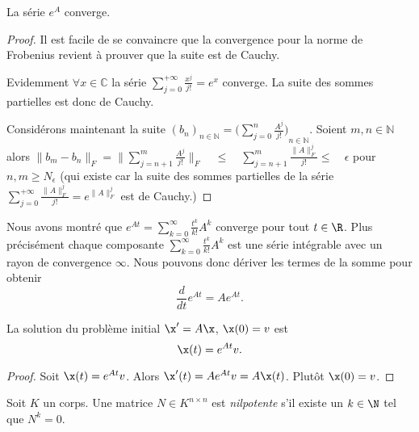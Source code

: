   \begin{lemma}
    \label{lem:17}
    La série $e^A$ converge. 
  \end{lemma}

  \begin{proof}
Il est facile de se convaincre que la convergence pour la norme de Frobenius revient à prouver que la suite est de Cauchy. 

Evidemment $\forall x \in \mathbb{C}$ la série $\sum _{ j=0 }^{ +\infty  }{ \frac { { x }^{ j } }{ j! } ={ e }^{ x } } $ converge. La suite des sommes partielles est donc de Cauchy.

Considérons maintenant la suite $(b_n)_{n\in \mathbb{N}} = { (\sum _{ j=0 }^{ n }{ \frac { { A }^{ j } }{ j! } ) }  }_{ n\in \mathbb{N} }$. Soient $m,n \in \mathbb{N}$ alors $\parallel b_{ m }-b_{ n }\parallel _{ F }=\parallel \sum _{ j=n+1 }^{ m }{ \frac { A^{ j } }{ j! }  } \parallel _{ F }\quad \le \quad \sum_{j=n+1}^{m}{\frac{\parallel A\parallel_{F}^{j}}{j!}} \le \quad \epsilon $ pour $n,m \ge N_{\epsilon}$ (qui existe car la suite des sommes partielles de la série $\sum _{ j=0 }^{ +\infty }{ \frac { \parallel A\parallel _{ F }^{ j } }{ j! }  } = e^{\parallel A\parallel _{ F }^{ j }} $ est de Cauchy.)
  \end{proof}


Nous avons montré que $e^{At} = \sum_{k=0}^\infty \frac{t^k}{k!} A^k$ converge pour tout $t \in \R$. Plus précisément chaque composante $\sum_{k=0}^\infty \frac{t^k}{k!} A^k$ est une série intégrable avec un rayon de convergence $\infty$. Nous pouvons donc dériver les termes de la somme pour obtenir 
\begin{equation}
  \label{eq:24}
  \frac{d}{dt} e^{At} = A e^{At}. 
\end{equation}


\begin{theorem}
  \label{thr:31}
  La solution du problème initial $\x' = A\x$, $\x(0) =v$ est 
  \begin{displaymath}
    \x(t) = e^{At} v.
  \end{displaymath}
\end{theorem}

\begin{proof}
  Soit $\x(t) = e^{At} v$. Alors $\x'(t) = A e^{At}v = A\x(t)$. Plutôt $\x(0) = v$. 
\end{proof}

\begin{definition}
  \label{def:29}Soit $K$ un corps. 
  Une matrice $N ∈ K^{n ×n}$ est \emph{nilpotente} s'il existe un $k \in \N$ tel que $N^k = 0$. 
\end{definition}

